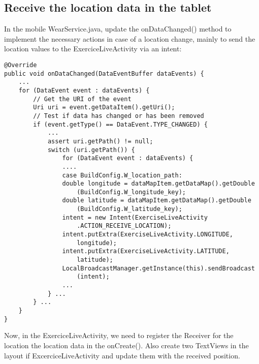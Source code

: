 \documentclass[11pt]{article}
\begin{document}
\subsection{Receive the location data in the tablet}
In the mobile WearService.java, update the onDataChanged() method to implement the necessary actions in case of a location change, mainly to send the location values to the ExerciceLiveActivity via an intent:
\begin{lstlisting}
@Override
public void onDataChanged(DataEventBuffer dataEvents) {
    ...
    for (DataEvent event : dataEvents) {
        // Get the URI of the event
        Uri uri = event.getDataItem().getUri();
        // Test if data has changed or has been removed
        if (event.getType() == DataEvent.TYPE_CHANGED) {
            ...
            assert uri.getPath() != null;
            switch (uri.getPath()) {
                for (DataEvent event : dataEvents) {
                ....
                case BuildConfig.W_location_path:
                double longitude = dataMapItem.getDataMap().getDouble
                    (BuildConfig.W_longitude_key);
                double latitude = dataMapItem.getDataMap().getDouble
                    (BuildConfig.W_latitude_key);
                intent = new Intent(ExerciseLiveActivity
                    .ACTION_RECEIVE_LOCATION);
                intent.putExtra(ExerciseLiveActivity.LONGITUDE,
                    longitude);
                intent.putExtra(ExerciseLiveActivity.LATITUDE,
                    latitude);
                LocalBroadcastManager.getInstance(this).sendBroadcast
                    (intent);
                ...
            } ...
        } ...
    }
}
\end{lstlisting}
Now, in the ExerciceLiveActivity, we need to register the Receiver for the location the location data in the onCreate(). Also create two TextViews in the layout if ExcerciceLiveActivity and update them with the received position.
\end{document}
